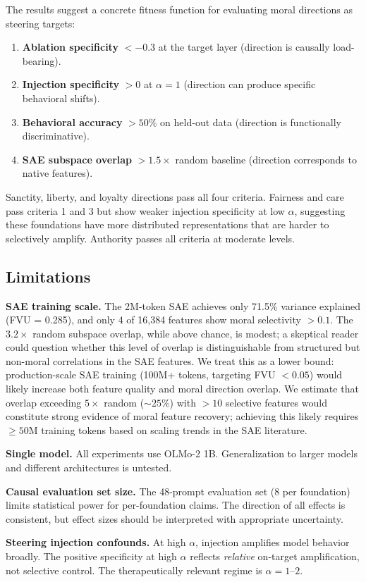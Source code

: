 The results suggest a concrete fitness function for evaluating moral directions as steering targets:

\begin{enumerate}
\def\labelenumi{\arabic{enumi}.}
\tightlist
\item
  \textbf{Ablation specificity} \(< -0.3\) at the target layer (direction is causally load-bearing).
\item
  \textbf{Injection specificity} \(> 0\) at \(\alpha = 1\) (direction can produce specific behavioral shifts).
\item
  \textbf{Behavioral accuracy} \(> 50\%\) on held-out data (direction is functionally discriminative).
\item
  \textbf{SAE subspace overlap} \(> 1.5\times\) random baseline (direction corresponds to native features).
\end{enumerate}

Sanctity, liberty, and loyalty directions pass all four criteria.
Fairness and care pass criteria 1 and 3 but show weaker injection specificity at low \(\alpha\), suggesting these foundations have more distributed representations that are harder to selectively amplify.
Authority passes all criteria at moderate levels.

\subsection{Limitations}\label{limitations}

\textbf{SAE training scale.} The 2M-token SAE achieves only 71.5\% variance explained (FVU = 0.285), and only 4 of 16,384 features show moral selectivity \(> 0.1\).
The \(3.2\times\) random subspace overlap, while above chance, is modest; a skeptical reader could question whether this level of overlap is distinguishable from structured but non-moral correlations in the SAE features.
We treat this as a lower bound: production-scale SAE training (100M+ tokens, targeting FVU \(< 0.05\)) would likely increase both feature quality and moral direction overlap.
We estimate that overlap exceeding \(5\times\) random (\({\sim}25\%\)) with \(> 10\) selective features would constitute strong evidence of moral feature recovery; achieving this likely requires \(\geq 50\)M training tokens based on scaling trends in the SAE literature.

\textbf{Single model.} All experiments use OLMo-2 1B.
Generalization to larger models and different architectures is untested.

\textbf{Causal evaluation set size.} The 48-prompt evaluation set (8 per foundation) limits statistical power for per-foundation claims.
The direction of all effects is consistent, but effect sizes should be interpreted with appropriate uncertainty.

\textbf{Steering injection confounds.} At high \(\alpha\), injection amplifies model behavior broadly.
The positive specificity at high \(\alpha\) reflects \emph{relative} on-target amplification, not selective control.
The therapeutically relevant regime is \(\alpha = 1\)--\(2\).
